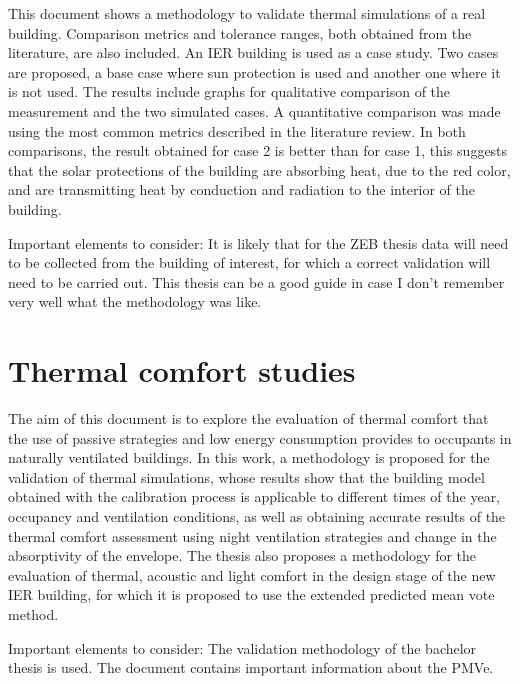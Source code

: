 This document shows a methodology to validate thermal simulations of a real building. Comparison metrics and tolerance ranges, both obtained from the literature, are also included. An IER building is used as a case study. Two cases are proposed, a base case where sun protection is used and another one where it is not used. The results include graphs for qualitative comparison of the measurement and the two simulated cases. A quantitative comparison was made using the most common metrics described in the literature review. In both comparisons, the result obtained for case 2 is better than for case 1, this suggests that the solar protections of the building are absorbing heat, due to the red color, and are transmitting heat by conduction and radiation to the interior of the building.


Important elements to consider: It is likely that for the ZEB thesis data will need to be collected from the building of interest, for which a correct validation will need to be carried out. This thesis can be a good guide in case I don't remember very well what the methodology was like.


\section{Thermal comfort studies}

The aim of this document is to explore the evaluation of thermal comfort that the use of passive strategies and low energy consumption provides to occupants in naturally ventilated buildings. In this work, a methodology is proposed for the validation of thermal simulations, whose results show that the building model obtained with the calibration process is applicable to different times of the year, occupancy and ventilation conditions, as well as obtaining accurate results of the thermal comfort assessment using night ventilation strategies and change in the absorptivity of the envelope. The thesis also proposes a methodology for the evaluation of thermal, acoustic and light comfort in the design stage of the new IER building, for which it is proposed to use the extended predicted mean vote method.


Important elements to consider: The validation methodology of the bachelor thesis is used. The document contains important information about the PMVe.



